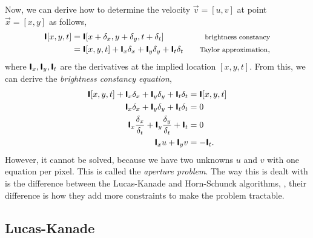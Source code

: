 Now, we can derive how to determine the velocity $\vec{v}=[u,v]$ at point
$\vec{x}=[x,y]$ as follows,
\begin{align*}
  \tens{I}[x,y,t] &= \tens{I}[x+\delta_x,y+\delta_y,t+\delta_t] & \text{\footnotesize brightness constancy} \\
  &= \tens{I}[x,y,t] + \tens{I}_x\delta_x + \tens{I}_y\delta_y + \tens{I}_t\delta_t & \text{\footnotesize Taylor approximation}
,\end{align*}
where $\bm{\mathsf{I}}_x,\bm{\mathsf{I}}_y,\bm{\mathsf{I}}_t$ are the derivatives at the implied
location $[x,y,t]$. From this, we can derive the \textit{brightness constancy
equation},
\begin{align*}
  \bm{\mathsf{I}}[x,y,t] + \bm{\mathsf{I}}_x\delta_x + \bm{\mathsf{I}}_y\delta_y + \bm{\mathsf{I}}_t\delta_t &= \bm{\mathsf{I}}[x,y,t] \\
  \bm{\mathsf{I}}_x\delta_x + \bm{\mathsf{I}}_y\delta_y + \bm{\mathsf{I}}_t\delta_t &= 0 \\
  \bm{\mathsf{I}}_x\frac{\delta_x}{\delta_t} + \bm{\mathsf{I}}_y\frac{\delta_y}{\delta_t} + \bm{\mathsf{I}}_t &= 0 \\
  \bm{\mathsf{I}}_xu + \bm{\mathsf{I}}_yv &= -\bm{\mathsf{I}}_t
.\end{align*}
However, it cannot be solved, because we have two unknowns $u$ and $v$ with one
equation per pixel. This is called the \textit{aperture problem}. The way this
is dealt with is the difference between the Lucas-Kanade and Horn-Schunck
algorithms, \ie, their difference is how they add more constraints to make the
problem tractable.

\subsection{Lucas-Kanade}

